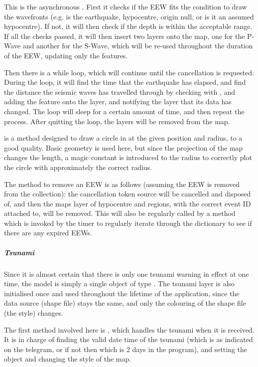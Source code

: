 This is the asynchronous . First it checks if the EEW fits the condition to draw the wavefronts (e.g. is the earthquake, hypocentre, origin null, or is it an assumed hypocentre). If not, it will then check if the depth is within the acceptable range. If all the checks passed, it will then insert two layers onto the map, one for the P-Wave and another for the S-Wave, which will be re-used throughout the duration of the EEW, updating only the features.

Then there is a while loop, which will continue until the cancellation is requested. During the loop, it will find the time that the earthquake has elapsed, and find the distance the seismic waves has travelled through by checking with , and adding the feature onto the layer, and notifying the layer that its data has changed. The loop will sleep for a certain amount of time, and then repeat the process. After quitting the loop, the layers will be removed from the map.

 is a method designed to draw a circle in  at the given position and radius, to a good quality. Basic geometry is used here, but since the projection of the map changes the length, a magic constant is introduced to the radius to correctly plot the circle with approximately the correct radius.

The method to remove an EEW is as follows (assuming the EEW is removed from the collection): the cancellation token source will be cancelled and disposed of, and then the maps layer of hypocentre and regions, with the correct event ID attached to, will be removed. This will also be regularly called by a method which is invoked by the timer to regularly iterate through the dictionary to see if there are any expired EEWs.

\subparagraph{Tsunami}

Since it is almost certain that there is only one tsunami warning in effect at one time, the model  is simply a single object of type . The tsunami layer is also initialised once and used throughout the lifetime of the application, since the data source (shape file) stays the same, and only the colouring of the shape file (the style) changes.

The first method involved here is , which handles the tsunami when it is received. It is in charge of finding the valid date time of the tsunami (which is as indicated on the telegram, or if not then  which is 2 days in the program), and setting the  object and changing the style of the map.

